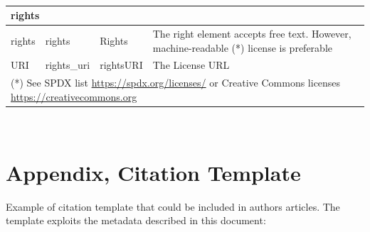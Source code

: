 \documentclass[11pt,a4paper]{ivoa}
\begin{document}
\paragraph{}
\begin{tabular}{|p{2.8cm}|p{3cm}|p{3cm}|p{4cm}|} \hline
\multicolumn{4}{|l|}{\textbf{rights}} \\ \hline
rights   & rights & Rights& 
          The right element accepts free text. However, machine-readable (*) license is preferable
         \\ \hline
URI     &  rights\_uri& rightsURI & The License URL\\ \hline
\multicolumn{4}{p{\textwidth}}{\small \footnotesize(*) See SPDX list \url{https://spdx.org/licenses/} or Creative Commons licenses \url{https://creativecommons.org}}
\end{tabular}\\





\section{Appendix, Citation Template} \label{sec:appendixC}

Example of citation template that could be included in authors articles. The template exploits the metadata described in this document:\\
\end{document}
